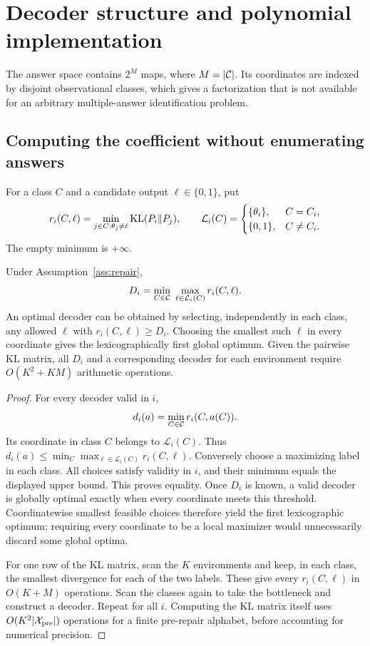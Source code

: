 \section{Decoder structure and polynomial implementation}
\label{sec:decoder-structure}
The answer space contains $2^M$ maps, where $M=|\mathcal C|$. Its coordinates are
indexed by disjoint observational classes, which gives a factorization that is
not available for an arbitrary multiple-answer identification problem.

\subsection{Computing the coefficient without enumerating answers}
For a class $C$ and a candidate output $\ell\in\{0,1\}$, put
\[
r_i(C,\ell)=\min_{j\in C:\theta_j\ne\ell}\operatorname{KL}(P_i\Vert P_j),
\qquad
\mathcal L_i(C)=
\begin{cases}
\{\theta_i\},&C=C_i,\\
\{0,1\},&C\ne C_i.
\end{cases}
\]
The empty minimum is $+\infty$.
\begin{theorem}
\label{thm:factorization}
Under Assumption~\ref{ass:repair},
\begin{equation}
D_i=\min_{C\in\mathcal C}\ \max_{\ell\in\mathcal L_i(C)}r_i(C,\ell).
\label{eq:factorization}
\end{equation}
An optimal decoder can be obtained by selecting, independently in each class,
any allowed $\ell$ with $r_i(C,\ell)\ge D_i$. Choosing the smallest such $\ell$
in every coordinate gives the lexicographically first global optimum.
Given the pairwise KL matrix, all $D_i$ and a corresponding decoder for each
environment require $O(K^2+KM)$ arithmetic operations.
\end{theorem}
\begin{proof}
For every decoder valid in $i$,
\[
d_i(a)=\min_{C\in\mathcal C}r_i(C,a(C)).
\]
Its coordinate in class $C$ belongs to $\mathcal L_i(C)$. Thus
$d_i(a)\le\min_C\max_{\ell\in\mathcal L_i(C)}r_i(C,\ell)$.
Conversely choose a maximizing label in each class. All choices satisfy
validity in $i$, and their minimum equals the displayed upper bound.
This proves equality. Once $D_i$ is known, a valid decoder is globally optimal
exactly when every coordinate meets this threshold. Coordinatewise smallest
feasible choices therefore yield the first lexicographic optimum; requiring
every coordinate to be a local maximizer would unnecessarily discard some
global optima.

For one row of the KL matrix, scan the $K$ environments and keep, in each
class, the smallest divergence for each of the two labels. These give every
$r_i(C,\ell)$ in $O(K+M)$ operations. Scan the classes again to take the
bottleneck and construct a decoder. Repeat for all $i$. Computing the KL
matrix itself uses $O(K^2|\mathcal X_{\rm pre}|)$ operations for a finite
pre-repair alphabet, before accounting for numerical precision.
\end{proof}

